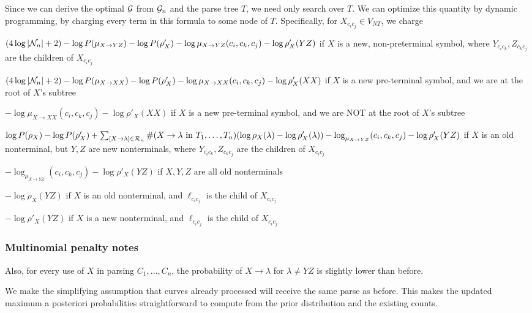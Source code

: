 \documentclass{article}
\begin{document}
Since we can derive the optimal ${\mathcal G}$ from ${\mathcal G}_n$ and the parse
tree $T$, we need only search over $T$. We can optimize this quantity
by dynamic programming, by charging every term in this formula to some
node of $T$. Specifically, for $X_{c_i c_j}\in V_{NT}$, we charge
\bitem
\item $(4\log |{\mathcal N}_n| +2) - \log P(\mu_{X\to YZ}) - \log P(\rho'_X)
  -\log \mu_{X\to YZ}(c_i,c_k,c_j) - \log \rho'_X(YZ)$ if $X$ is a new,
  non-preterminal symbol, where $Y_{c_i c_k}, Z_{c_k c_j}$ are the
  children of $X_{c_i c_j}$
\item $(4\log |{\mathcal N}_n| +2) - \log P(\mu_{X\to XX}) - \log P(\rho'_X)
  -\log \mu_{X\to XX}(c_i,c_k,c_j) - \log \rho'_X(XX)$ if $X$ is a new
  pre-terminal symbol, and we are at the root of $X$'s subtree
\item $-\log \mu_{X\to XX}(c_i,c_k,c_j) - \log \rho'_X(XX)$ if $X$ is a new
  pre-terminal symbol, and we are NOT at the root of $X$'s subtree
\item $\log P(\rho_X) - \log P(\rho'_X) + \sum_{[X\to \lambda]\in
  {\mathcal R}_n} \#(X\to \lambda \text{ in } T_1,\dots, T_n) (\log
  \rho_X(\lambda) - \log \rho'_X(\lambda)) -\log_{\mu_{X\to YZ}} (c_i,
  c_k, c_j) - \log \rho'_X(YZ)$ if $X$ is an old nonterminal, but
  $Y,Z$ are new nonterminals, where $Y_{c_i c_k}, Z_{c_k c_j}$ are the
  children of $X_{c_i c_j}$
\item $ -\log_{\mu_{X\to YZ}} (c_i, c_k, c_j) - \log \rho'_X(YZ)$ if
  $X,Y,Z$ are all old nonterminals
\item $ - \log \rho_X(YZ)$ if
  $X$ is an old nonterminal, and $\ell_{c_i c_j}$ is the child of
  $X_{c_i c_j}$
\item $ - \log \rho'_X(YZ)$ if
  $X$ is a new nonterminal, and $\ell_{c_i c_j}$ is the child of
  $X_{c_i c_j}$
\eitem


\subsubsection{Multinomial penalty notes}

Also, for every use of $X$ in parsing $C_1, \dots, C_n$, the
probability of $X\to \lambda$ for $\lambda \ne YZ$ is slightly lower
than before.

We make the simplifying assumption that curves already processed will
receive the same parse as before. This makes the updated maximum a
posteriori probabilities straightforward to compute from the prior
distribution and the existing counts.
  
\end{document}
